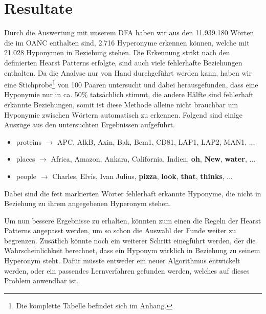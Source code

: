 \section{Resultate}

Durch die Auswertung mit unserem DFA haben wir aus den 11.939.180 Wörten
die im OANC enthalten sind, 2.716 Hyperonyme erkennen können, welche
mit 21.028 Hyponymen in Beziehung stehen. Die Erkennung strikt nach
den definierten Hearst Patterns erfolgte, sind auch viele fehlerhafte
Beziehungen enthalten. Da die Analyse nur von Hand durchgeführt werden
kann, haben wir eine Stichprobe\footnote{Die komplette Tabelle
  befindet sich im Anhang.} von 100 Paaren untersucht und dabei
herausgefunden, dass eine Hyponymie nur in ca. 50\% tatsächlich
stimmt, die andere Hälfte sind fehlerhaft erkannte Beziehungen, somit
ist diese Methode alleine nicht brauchbar um Hyponymie zwischen
Wörtern automatisch zu erkennen. Folgend sind einige Auszüge aus den
untersuchten Ergebnissen aufgeführt.

\begin{itemize}
\item proteins $\rightarrow$ APC, AlkB, Axin, Bak, Bem1, CD81, LAP1,
  LAP2, MAN1, ...
\item places $\rightarrow$ Africa, Amazon, Ankara, California, Indien,
  \textbf{oh}, \textbf{New}, \textbf{water}, ...
\item people $\rightarrow$ Charles, Elvis, Ivan Julius,
  \textbf{pizza}, \textbf{look}, \textbf{that}, \textbf{thinks}, ...
\end{itemize}

Dabei sind die fett markierten Wörter fehlerhaft erkannte Hyponyme,
die nicht in Beziehung zu ihrem angegebenen Hyperonym stehen.

Um nun bessere Ergebnisse zu erhalten, könnten zum einen die Regeln
der Hearst Patterns angepasst werden, um so schon die Auswahl der
Funde weiter zu begrenzen. Zusätlich könnte noch ein weiterer
Schritt einegführt werden, der die Wahrscheinlichkeit berechnet, dass
ein Hyponym wirklich in Beziehung zu seinem Hyperonym steht. Dafür
müsste entweder ein neuer Algorithmus entwickelt werden, oder ein
passendes Lernverfahren gefunden werden, welches auf dieses Problem
anwendbar ist.